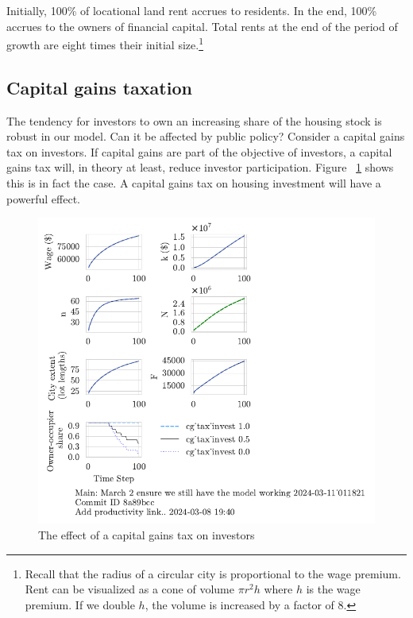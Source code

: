 Initially, 100\% of locational land rent accrues to residents. In the end, 100\% accrues to the owners of financial capital. Total rents at the end of the period of growth are eight times their initial size.\footnote{Recall that the radius of a circular city is proportional to the wage premium. Rent can be visualized as a cone of volume $\pi r^2 h$ where $h$ is the wage premium. If we double $h$, the volume is increased by a factor of 8.}

\subsection{Capital gains taxation}
The tendency for investors to own an increasing share of the housing stock is robust in our model. Can it be affected by public policy? Consider a capital gains tax on investors. If capital gains are part of the objective of investors, a capital gains tax will, in theory at least, reduce investor participation. Figure ~\ref{fig:CGinvest_ownership_trajectory} shows this is in fact the case. A capital gains tax on housing investment will have a powerful effect.
\begin{figure}[htb]
    \centering
    \includegraphics[scale=.8, trim={0 1.4cm 0 0},clip]{fig/cg_tax_invest-Main-_011821.pdf}
    \caption{The effect of a capital gains tax on investors}
    \label{fig:CGinvest_ownership_trajectory}
\end{figure}

